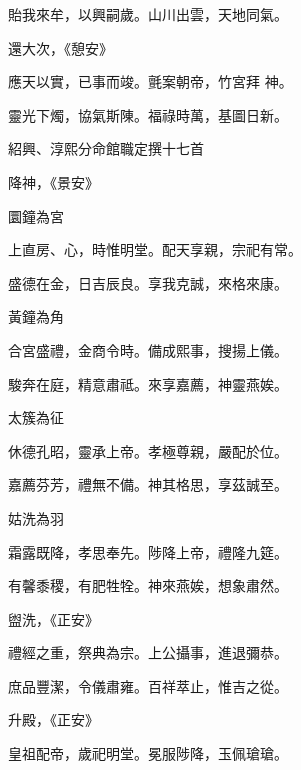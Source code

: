 \begin{pinyinscope}
 貽我來牟，以興嗣歲。山川出雲，天地同氣。



 還大次，《憩安》



 應天以實，已事而竣。氈案朝帝，竹宮拜
 神。



 靈光下燭，協氣斯陳。福祿時萬，基圖日新。



 紹興、淳熙分命館職定撰十七首



 降神，《景安》



 圜鐘為宮



 上直房、心，時惟明堂。配天享親，宗祀有常。



 盛德在金，日吉辰良。享我克誠，來格來康。



 黃鐘為角



 合宮盛禮，金商令時。備成熙事，搜揚上儀。



 駿奔在庭，精意肅祗。來享嘉薦，神靈燕娭。



 太簇為征



 休德孔昭，靈承上帝。孝極尊親，嚴配於位。



 嘉薦芬芳，禮無不備。神其格思，享茲誠至。



 姑洗為羽



 霜露既降，孝思奉先。陟降上帝，禮隆九筵。



 有馨黍稷，有肥牲牷。神來燕娭，想象肅然。



 盥洗，《正安》



 禮經之重，祭典為宗。上公攝事，進退彌恭。



 庶品豐潔，令儀肅雍。百祥萃止，惟吉之從。



 升殿，《正安》



 皇祖配帝，歲祀明堂。冕服陟降，玉佩瑲瑲。




\end{pinyinscope}

